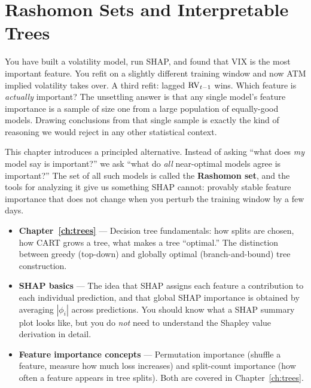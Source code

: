 
\chapter{Rashomon Sets and Interpretable Trees}\label{ch:rashomon}

You have built a volatility model, run SHAP, and found that VIX is the most
important feature.  You refit on a slightly different training window and now
ATM implied volatility takes over.  A third refit: lagged $\operatorname{RV}_{t-1}$ wins.
Which feature is \emph{actually} important?  The unsettling answer is that any
single model's feature importance is a sample of size one from a large
population of equally-good models.  Drawing conclusions from that single
sample is exactly the kind of reasoning we would reject in any other
statistical context.

This chapter introduces a principled alternative.  Instead of asking ``what
does \emph{my} model say is important?'' we ask ``what do \emph{all}
near-optimal models agree is important?''  The set of all such models is
called the \textbf{Rashomon set}, and the tools for analyzing it give us
something SHAP cannot: provably stable feature importance that does not
change when you perturb the training window by a few days.

\begin{prereq}
\begin{itemize}[leftmargin=1.8em]
  \item \textbf{Chapter~\ref{ch:trees}} --- Decision tree fundamentals: how
    splits are chosen, how CART grows a tree, what makes a tree
    ``optimal.''  The distinction between greedy (top-down) and globally
    optimal (branch-and-bound) tree construction.
  \item \textbf{SHAP basics} --- The idea that SHAP assigns each feature a
    contribution to each individual prediction, and that global SHAP
    importance is obtained by averaging $|\phi_i|$ across predictions.
    You should know what a SHAP summary plot looks like, but you do
    \emph{not} need to understand the Shapley value derivation in detail.
  \item \textbf{Feature importance concepts} --- Permutation importance
    (shuffle a feature, measure how much loss increases) and split-count
    importance (how often a feature appears in tree splits).  Both are
    covered in Chapter~\ref{ch:trees}.
\end{itemize}
\end{prereq}


